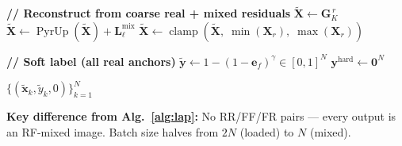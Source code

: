 \documentclass[12pt]{article}
\begin{document}
\begin{algorithm}[p]
\begin{algorithmic}[1]
\State \textbf{// Reconstruct from coarse real + mixed residuals}
\State $\tilde{\mathbf{X}} \gets \mathbf{G}_K^{\,r}$ 
  \State $\tilde{\mathbf{X}} \gets \operatorname{PyrUp}(\tilde{\mathbf{X}}) + \mathbf{L}_\ell^{\text{mix}}$
\EndFor
\State $\tilde{\mathbf{X}} \gets \operatorname{clamp}(\tilde{\mathbf{X}},\; \min(\mathbf{X}_r),\; \max(\mathbf{X}_r))$ 

\State \textbf{// Soft label (all real anchors)}
\State $\tilde{\mathbf{y}} \gets 1 - (1 - \mathbf{e}_f)^{\gamma} \in [0,1]^{N}$
\State $\mathbf{y}^{\text{hard}} \gets \mathbf{0}^{N}$ 

\State \Return $\{(\tilde{\mathbf{x}}_k, \tilde{y}_k, 0)\}_{k=1}^{N}$

\vspace{4pt}
\State \textbf{Key difference from Alg.~\ref{alg:lap}:} No RR/FF/FR pairs — every output is
\State an RF-mixed image. Batch size halves from $2N$ (loaded) to $N$ (mixed).
\end{algorithmic}
\end{algorithm}
\end{document}

